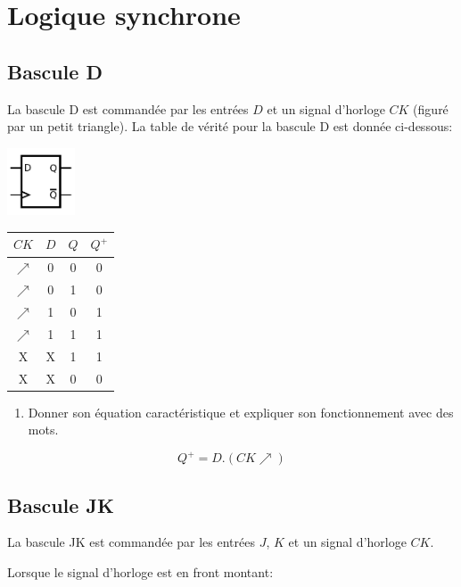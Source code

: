 \documentclass[a4paper,10pt]{exam}
\begin{document}
\section{Logique synchrone}
\subsection{Bascule D}

La bascule D est commandée par les entrées $D$ et un signal d'horloge $CK$
(figuré par un petit triangle).
La table de vérité pour la bascule D est donnée ci-dessous:

\begin{center}
\includegraphics[width=2cm]{Dflipflop}\begin{tabular}{c|c|c|c}
  $CK$&$D$&$Q$&$Q^{+}$\\
  \hline
  $\nearrow$&0  & 0     &0\\
  $\nearrow$&0  & 1     &0\\
  $\nearrow$&1  & 0     &1\\
  $\nearrow$&1  & 1     &1\\
  X         &X  & 1     &1\\
  X         &X  & 0     &0\\
\end{tabular}
\end{center}

\begin{enumerate}
  \item Donner son équation caractéristique et expliquer son fonctionnement avec
    des mots.
\end{enumerate}

\begin{solution}
  $$ Q^{+}= D . (CK\nearrow)$$
\end{solution}

\subsection{Bascule JK}

La bascule JK est commandée par les entrées $J$, $K$ et un signal d'horloge
$CK$.

Lorsque le signal d'horloge est en front montant:
\end{document}
